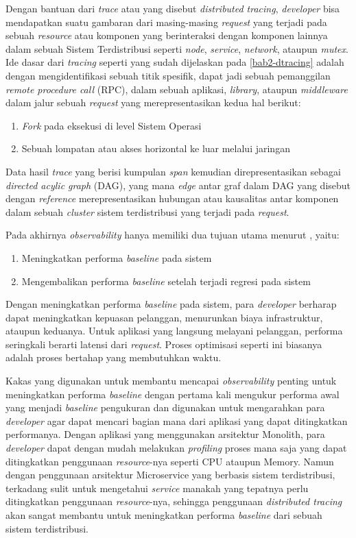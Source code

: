  
 Dengan bantuan dari \textit{trace} atau yang disebut \textit{distributed tracing}, \textit{developer} bisa mendapatkan suatu gambaran dari masing-masing \textit{request} yang terjadi pada sebuah \textit{resource} atau komponen yang berinteraksi dengan komponen lainnya dalam sebuah Sistem Terdistribusi seperti \textit{node}, \textit{service}, \textit{network}, ataupun \textit{mutex}. Ide dasar dari \textit{tracing} seperti yang sudah dijelaskan pada \ref{bab2-dtracing} adalah dengan mengidentifikasi sebuah titik spesifik, dapat jadi sebuah pemanggilan \textit{remote procedure call} (RPC), dalam sebuah aplikasi, \textit{library}, ataupun \textit{middleware} dalam jalur sebuah \textit{request} yang merepresentasikan kedua hal berikut:
 \begin{enumerate}
 \item \textit{Fork} pada eksekusi di level Sistem Operasi
 \item Sebuah lompatan atau akses horizontal ke luar melalui jaringan
\end{enumerate}

Data hasil \textit{trace} yang berisi kumpulan \textit{span} kemudian direpresentasikan sebagai \textit{directed acylic graph} (DAG), yang mana \textit{edge} antar graf dalam DAG yang disebut dengan \textit{reference} merepresentasikan hubungan atau kausalitas antar komponen dalam sebuah \textit{cluster} sistem terdistribusi yang terjadi pada \textit{request}. 

Pada akhirnya \textit{observability} hanya memiliki dua tujuan utama menurut \citep{parker2020distributed}, yaitu:
\begin{enumerate}
	\item Meningkatkan performa \textit{baseline} pada sistem
	\item Mengembalikan performa \textit{baseline} setelah terjadi regresi pada sistem
\end{enumerate}

Dengan meningkatkan performa \textit{baseline} pada sistem, para \textit{developer} berharap dapat meningkatkan kepuasan pelanggan, menurunkan biaya infrastruktur, ataupun keduanya. Untuk aplikasi yang langsung melayani pelanggan, performa seringkali berarti latensi dari \textit{request}. Proses optimisasi seperti ini biasanya adalah proses bertahap yang membutuhkan waktu.

Kakas yang digunakan untuk membantu mencapai \textit{observability} penting untuk meningkatkan performa \textit{baseline} dengan pertama kali mengukur performa awal yang menjadi \textit{baseline} pengukuran dan digunakan untuk mengarahkan para \textit{developer} agar dapat mencari bagian mana dari aplikasi yang dapat ditingkatkan performanya. Dengan aplikasi yang menggunakan arsitektur Monolith, para \textit{developer} dapat dengan mudah melakukan \textit{profiling} proses mana saja yang dapat ditingkatkan penggunaan \textit{resource}-nya seperti CPU ataupun Memory. Namun dengan penggunaan arsitektur Microservice yang berbasis sistem terdistribusi, terkadang sulit untuk mengetahui \textit{service} manakah yang tepatnya perlu ditingkatkan penggunaan \textit{resource}-nya, sehingga penggunaan \textit{distributed tracing} akan sangat membantu untuk meningkatkan performa \textit{baseline} dari sebuah sistem terdistribusi.

